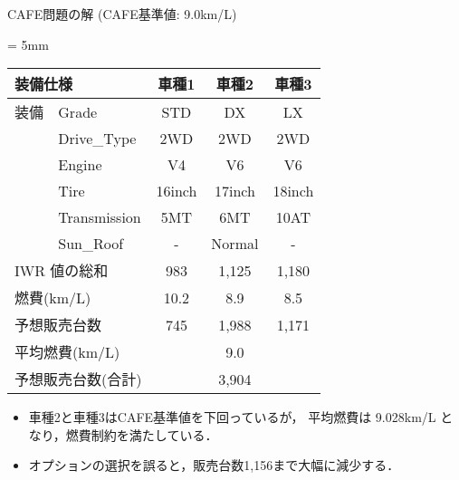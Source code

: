 \documentclass[dvipdfmx, 11pt]{beamer}
\begin{document}
\begin{frame}{CAFE問題の解 {\normalsize (CAFE基準値: 9.0km/L)}}
 \begin{exampleblock}{}
  \centering
  \tabcolsep = 5mm
  \begin{tabular}{l|l|c|c|c} 
    \multicolumn{2}{l|}{装備仕様}  & 車種1 & 車種2 & 車種3 \\\hline
    装備 & \textsf{Grade}  & \textsf{STD}    & \textsf{DX}     & \textsf{LX}\\
    &\textsf{Drive\_Type}  & \textsf{2WD}    & \textsf{2WD}    & \textsf{2WD}\\
    &\textsf{Engine}	   & \textsf{V4}     & \textsf{V6}     & \textsf{V6}\\
    &\textsf{Tire}	   & \textsf{16inch} & \textsf{17inch} & \textsf{18inch}\\
    &\textsf{Transmission} & \textsf{5MT}    & \textsf{6MT}    & \textsf{10AT}\\
    &\textsf{Sun\_Roof}    & -               & \textsf{Normal} & -  \\ \hline
    \multicolumn{2}{l|}{IWR 値の総和} & 983  & 1,125   & 1,180 \\ %
    \multicolumn{2}{l|}{燃費(km/L)}      & 10.2  & 8.9     & 8.5 \\ %
    \multicolumn{2}{l|}{予想販売台数}    & 745   & 1,988   & 1,171  \\ \hline
    \multicolumn{2}{l|}{平均燃費(km/L)}  & \multicolumn{3}{c}{9.0} \\ 
    \multicolumn{2}{l|}{予想販売台数(合計)}  & \multicolumn{3}{c}{3,904} \\ 
  \end{tabular}
 \end{exampleblock}
 \vfill
 \begin{itemize}
 \item 車種2と車種3はCAFE基準値を下回っているが，
   平均燃費は 9.028km/L となり，燃費制約を満たしている．
 \item オプションの選択を誤ると，販売台数1,156まで大幅に減少する．
 \end{itemize}
\end{frame}
\end{document}
